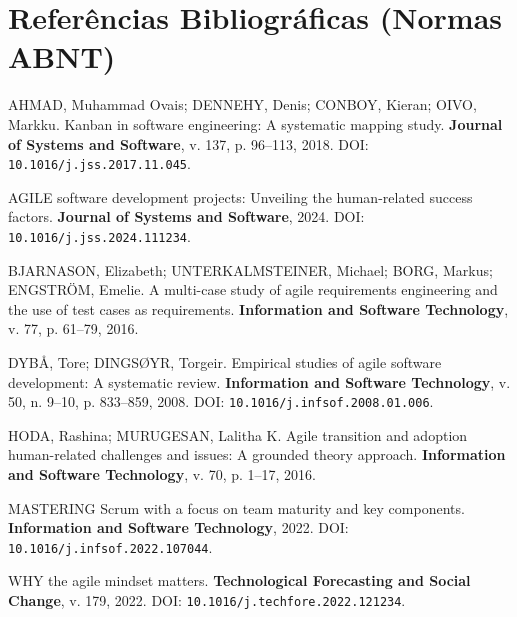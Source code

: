 \documentclass[12pt]{article}
\begin{document}
\vspace{0.2cm}
\begin{caixaResposta}
\end{caixaResposta}

\vspace{0.8cm}

\newpage
\section*{Referências Bibliográficas (Normas ABNT)}

\begin{small}
\begin{enumerate}[label={[\arabic*]},leftmargin=*]
    \setlength{\itemsep}{0.3cm}
    
    \item AHMAD, Muhammad Ovais; DENNEHY, Denis; CONBOY, Kieran; OIVO, Markku. Kanban in software engineering: A systematic mapping study. \textbf{Journal of Systems and Software}, v. 137, p. 96--113, 2018. DOI: \texttt{10.1016/j.jss.2017.11.045}.

    \item AGILE software development projects: Unveiling the human-related success factors. \textbf{Journal of Systems and Software}, 2024. DOI: \texttt{10.1016/j.jss.2024.111234}.

    \item BJARNASON, Elizabeth; UNTERKALMSTEINER, Michael; BORG, Markus; ENGSTRÖM, Emelie. A multi-case study of agile requirements engineering and the use of test cases as requirements. \textbf{Information and Software Technology}, v. 77, p. 61--79, 2016.

    \item DYBÅ, Tore; DINGSØYR, Torgeir. Empirical studies of agile software development: A systematic review. \textbf{Information and Software Technology}, v. 50, n. 9--10, p. 833--859, 2008. DOI: \texttt{10.1016/j.infsof.2008.01.006}.

    \item HODA, Rashina; MURUGESAN, Lalitha K. Agile transition and adoption human-related challenges and issues: A grounded theory approach. \textbf{Information and Software Technology}, v. 70, p. 1--17, 2016.

    \item MASTERING Scrum with a focus on team maturity and key components. \textbf{Information and Software Technology}, 2022. DOI: \texttt{10.1016/j.infsof.2022.107044}.

    \item WHY the agile mindset matters. \textbf{Technological Forecasting and Social Change}, v. 179, 2022. DOI: \texttt{10.1016/j.techfore.2022.121234}.
\end{enumerate}
\end{small}

\end{document}
